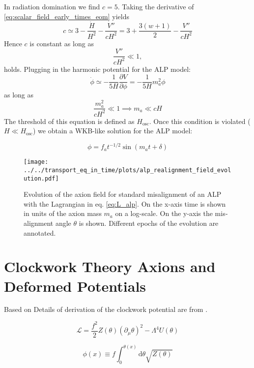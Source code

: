 \documentclass[master,       %
               twoside,        %
               BCOR10mm,       %
               english,ngerman, %
               ]{GAUBM}
\begin{document}
\begin{otherlanguage}{english}
In radiation domination we find $c = 5$.
Taking the derivative of \eqref{eq:scalar_field_early_times_eom} yields
\begin{equation}
	c \simeq 3 - \frac{\dot{H}}{H^2} - \frac{V''}{c H^2}
	= 3 + \frac{3(w + 1)}{2} - \frac{V''}{c H^2}
\end{equation}
Hence $c$ is constant as long as
\begin{equation}
	\frac{V''}{c H^2} \ll 1,
\end{equation}
holds.
Plugging in the harmonic potential for the ALP model:
\begin{equation}
	\dot{\phi} \simeq - \frac{1}{5 H} \frac{\partial V}{\partial \phi} = - \frac{1}{5 H} m_a^2 \phi
\end{equation}
as long as
\begin{equation}
	\frac{m_a^2}{c H^2} \ll 1 \implies m_a \ll c H
\end{equation}
The threshold of this equation is defined as $H_\mathrm{osc}$.
Once this condition is violated ($H \ll H_\mathrm{osc}$) we obtain a WKB-like solution for the ALP model:

\begin{equation}
	\phi = f_a t^{-1/2} \sin(m_a t + \delta)
\end{equation}


\begin{figure}[h]
    \texttt{[image: ../../transport\_eq\_in\_time/plots/alp\_realignment\_field\_evolution.pdf]}
    \caption{Evolution of the axion field for standard misalignment of an ALP with the Lagrangian in eq. \eqref{eq:L_alp}. On the x-axis time is shown in units of the axion mass $m_a$ on a log-scale. On the y-axis the misalignment angle $\theta$ is shown. Different epochs of the evolution are annotated.}
\end{figure}

\section{Clockwork Theory Axions and Deformed Potentials}

Based on \cite{Deformed_potential_Bae_2019}
Details of derivation of the clockwork potential are from \cite{general_cont_clockwork_Choi_2018}.

\begin{equation}
	\mathcal{L} = \frac{f^2}{2} Z(\theta) (\partial_\mu \theta)^2 - \Lambda^4 U(\theta)
\end{equation}

\begin{equation}
	\phi(x) \equiv f \int_0^{\theta(x)} \mathrm{d} \theta \sqrt{Z(\theta)}
\end{equation}


\end{otherlanguage}
\end{document}
